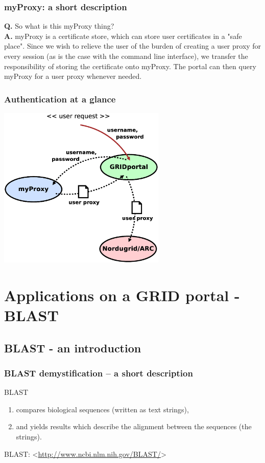 \documentclass{beamer}
\begin{document}
\begin{frame}
  \frametitle{myProxy: a short description}

	{\bf Q.} So what is this myProxy thing?\\
	{\bf A.} myProxy is a certificate store, which can store user certificates in a "safe place". Since we wish to relieve the user of the burden of creating a user proxy for every session (as is the case with the command line interface), we transfer the responsibility of storing the certificate onto myProxy. The portal can then query myProxy for a user proxy whenever needed.
\end{frame}


\begin{frame}
  \frametitle{Authentication at a glance}

	\begin{center}
		\includegraphics[width=0.6\textwidth]{myproxy.eps}
	\end{center}	
\end{frame}







\section{Applications on a GRID portal - BLAST}








\subsection{BLAST - an introduction}


\begin{frame}
  \frametitle{BLAST demystification -- a short description}

	BLAST
  \begin{enumerate}
  	\item compares biological sequences (written as text strings),
  	\item and yields results which describe the alignment between the sequences (the strings).
  \end{enumerate}
  {\footnotesize BLAST: <\url{http://www.ncbi.nlm.nih.gov/BLAST/}>}
\end{frame}
\end{document}
